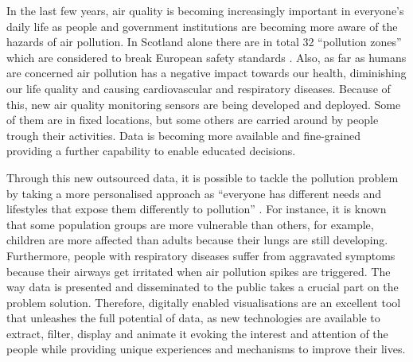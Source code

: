In the last few years, air quality is becoming increasingly important in everyone's daily life as people and government institutions are becoming more aware of the hazards of air pollution. In Scotland alone there are in total 32 ``pollution zones'' which are considered to break European safety standards \cite{Foe-scotland.org.uk} \cite{OKScotland2015}. Also, as far as humans are concerned air pollution has a negative impact towards our health, diminishing our life quality and causing cardiovascular and respiratory diseases. Because of this, new air quality monitoring sensors are being developed and deployed. Some of them are in fixed locations, but some others are carried around by people trough their activities. Data is becoming more available and fine-grained providing a further capability to enable educated decisions.

Through this new outsourced data, it is possible to tackle the pollution problem by taking a  more personalised approach as ``everyone has different needs and lifestyles that expose them differently to pollution'' \cite{Vazquez2016}. For instance, it is known that some population groups are more vulnerable than others, for example, children are more affected than adults because their lungs are still developing. Furthermore, people with respiratory diseases suffer from aggravated symptoms because their airways get irritated when air pollution spikes are triggered. The way data is presented and disseminated to the public takes a crucial part on the problem solution. Therefore, digitally enabled visualisations are an excellent tool that unleashes the full potential of data, as new technologies are available to extract, filter, display and animate it evoking the interest and attention of the people while providing unique experiences and mechanisms to improve their lives.

\iffalse
The effects of air pollution on human health are still complex to understand and there is much research ongoing on the combination short and long term effects upon a person's health. 
\fi